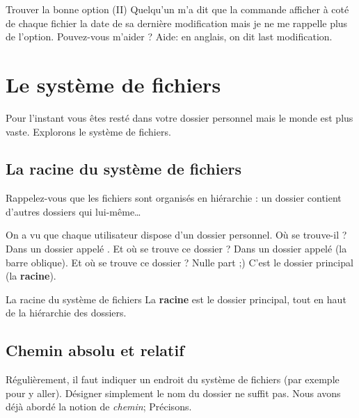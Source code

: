 \documentclass[a4paper,11pt]{style-esi/td}
\begin{document}
		\begin{Exercice}{Trouver la bonne option (II)}
			Quelqu'un m'a dit que la commande 
			afficher à coté de chaque fichier la date de sa dernière modification
			mais je ne me rappelle plus de l'option. 
			Pouvez-vous m'aider ?
			Aide: en anglais, on dit \og{}last modification\fg{}.
		\end{Exercice}

\section{Le système de fichiers}

	Pour l'instant vous êtes resté dans votre dossier personnel 
	mais le monde est plus vaste.
	Explorons le système de fichiers.

	\subsection{La racine du système de fichiers}

		Rappelez-vous que les fichiers sont organisés en hiérarchie :
		un dossier contient d'autres dossiers qui lui-même\dots

		On a vu que chaque utilisateur dispose d'un dossier personnel. 
		Où se trouve-il ? Dans un dossier appelé . 
		Et où se trouve ce dossier  ? 
		Dans un dossier appelé \og{}\samp{/}\fg{} (la barre oblique). 
		Et où se trouve ce dossier \og{}\samp{/}\fg{} ? Nulle part ;) 
		C'est le dossier principal (la \textbf{racine}).

		\begin{theorie}{La racine du système de fichiers}
			La \textbf{racine} est le dossier principal, 
			tout en haut de la hiérarchie des dossiers.
		\end{theorie}

	\subsection{Chemin absolu et relatif}

		
		\bigskip
		Régulièrement, il faut indiquer un endroit du système de fichiers 
		(par exemple pour y aller). 
		Désigner simplement le nom du dossier ne suffit pas.  
		Nous avons déjà abordé la notion de \emph{chemin}; Précisons.
\end{document}

